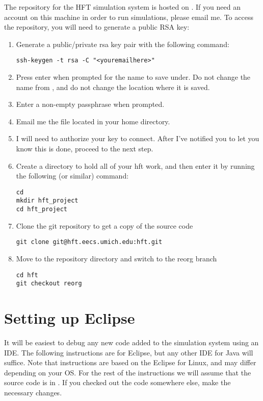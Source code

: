 \documentclass[11pt]{article}
\begin{document}
The repository for the HFT simulation system is hosted on . If
you
need an account on this machine in order to run simulations, please email me.
To access the repository, you will need to generate a public RSA key:
\begin{enumerate}
\item Generate a public/private rsa key pair with the following command:

\begin{verbatim}
ssh-keygen -t rsa -C "<youremailhere>"
\end{verbatim}

\item Press enter when prompted for the name to save under. Do not change the
  name from , and do not change the location where it is saved.
\item Enter a non-empty passphrase when prompted.
\item Email me the  file located in your home directory.
\item I will need to authorize your key to connect. After I've notified you to
  let you know this is done, proceed to the next step.
\item Create a directory to hold all of your hft work, and then enter it by
  running the following (or similar) command:

\begin{verbatim}
cd
mkdir hft_project
cd hft_project
\end{verbatim}

\item Clone the git repository to get a copy of the source code

\begin{verbatim}
git clone git@hft.eecs.umich.edu:hft.git
\end{verbatim}

\item Move to the repository directory and switch to the reorg branch

\begin{verbatim}
cd hft
git checkout reorg
\end{verbatim}

\end{enumerate}

\section{Setting up Eclipse}
It will be easiest to debug any new code added to the simulation system using an
IDE. The following instructions are for Eclipse, but any other IDE for Java will
suffice. Note that instructions are based on the Eclipse for Linux, and may
differ depending on your OS. For the rest of the instructions we will assume
that the source code is in . If you checked out the code
somewhere else, make the necessary changes.
\end{document}

